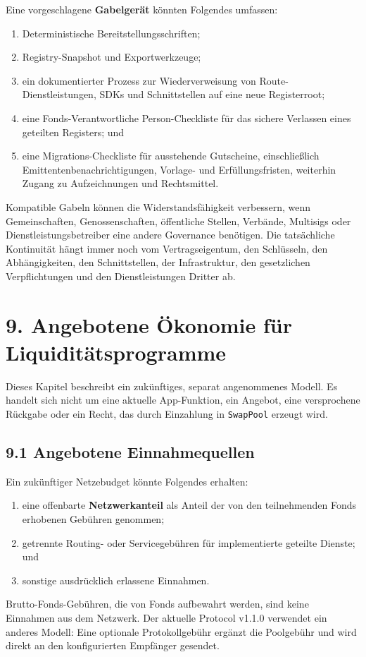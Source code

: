 \documentclass[11pt]{article}
\begin{document}
Eine vorgeschlagene \textbf{Gabelgerät} könnten Folgendes umfassen:

\begin{enumerate}[leftmargin=*]
\item Deterministische Bereitstellungsschriften;
\item Registry-Snapshot und Exportwerkzeuge;
\item ein dokumentierter Prozess zur Wiederverweisung von Route-Dienstleistungen, SDKs und Schnittstellen auf eine neue Registerroot;
\item eine Fonds-Verantwortliche Person-Checkliste für das sichere Verlassen eines geteilten Registers; und
\item eine Migrations-Checkliste für ausstehende Gutscheine, einschließlich Emittentenbenachrichtigungen, Vorlage- und Erfüllungsfristen, weiterhin Zugang zu Aufzeichnungen und Rechtsmittel.
\end{enumerate}
Kompatible Gabeln können die Widerstandsfähigkeit verbessern, wenn Gemeinschaften, Genossenschaften, öffentliche Stellen, Verbände, Multisigs oder Dienstleistungsbetreiber eine andere Governance benötigen. Die tatsächliche Kontinuität hängt immer noch vom Vertragseigentum, den Schlüsseln, den Abhängigkeiten, den Schnittstellen, der Infrastruktur, den gesetzlichen Verpflichtungen und den Dienstleistungen Dritter ab.


\section*{9. Angebotene Ökonomie für Liquiditätsprogramme}

Dieses Kapitel beschreibt ein zukünftiges, separat angenommenes Modell. Es handelt sich nicht um eine aktuelle App-Funktion, ein Angebot, eine versprochene Rückgabe oder ein Recht, das durch Einzahlung in \texttt{SwapPool} erzeugt wird.

\subsection*{9.1 Angebotene Einnahmequellen}

Ein zukünftiger Netzebudget könnte Folgendes erhalten:

\begin{enumerate}[leftmargin=*]
\item eine offenbarte \textbf{Netzwerkanteil} als Anteil der von den teilnehmenden Fonds erhobenen Gebühren genommen;
\item getrennte Routing- oder Servicegebühren für implementierte geteilte Dienste; und
\item sonstige ausdrücklich erlassene Einnahmen.
\end{enumerate}
Brutto-Fonds-Gebühren, die von Fonds aufbewahrt werden, sind keine Einnahmen aus dem Netzwerk. Der aktuelle Protocol v1.1.0 verwendet ein anderes Modell: Eine optionale Protokollgebühr ergänzt die Poolgebühr und wird direkt an den konfigurierten Empfänger gesendet.
\end{document}
